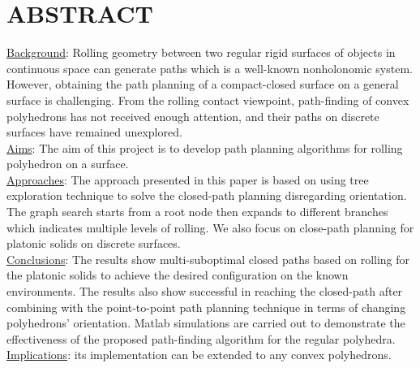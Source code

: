 
\noindent\section{ABSTRACT}
\noindent \uline{Background}: 
Rolling geometry between two regular rigid surfaces of objects in continuous space can generate paths which is a well-known nonholonomic system. However, obtaining the path planning of a compact-closed surface on a general surface is challenging. From the rolling contact viewpoint, path-finding of convex polyhedrons has not received enough attention, and their paths on discrete surfaces have remained unexplored. \\
\noindent \uline{Aims}: The aim of this project is to develop path planning algorithms for rolling polyhedron on a surface.\\
\noindent \uline{Approaches}: 
The approach presented in this paper is based on using tree exploration technique to solve the closed-path planning disregarding orientation. 
The graph search starts from a root node then expands to different branches which indicates multiple levels of rolling.
We also focus on close-path planning for platonic solids on discrete surfaces.\\
\noindent \uline{Conclusions}: 
The results show multi-suboptimal closed paths based on rolling for the platonic solids to achieve the desired configuration on the known environments. 
The results also show successful in reaching the closed-path after combining with the point-to-point path planning technique in terms of changing polyhedrons' orientation.
Matlab simulations are carried out to demonstrate the effectiveness of the proposed path-finding algorithm for the regular polyhedra. \\ 
\noindent \uline{Implications}: its implementation can be extended to any convex polyhedrons.




